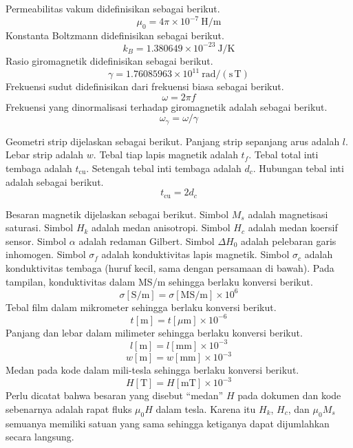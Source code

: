 \documentclass[a4paper,11pt]{article}
\begin{document}
Permeabilitas vakum didefinisikan sebagai berikut.
\begin{equation*}
\mu_{0} = 4\pi\times 10^{-7}\ \mathrm{H/m}
\end{equation*}
Konstanta Boltzmann didefinisikan sebagai berikut.
\begin{equation*}
k_{B} = 1.380649\times 10^{-23}\ \mathrm{J/K}
\end{equation*}
Rasio giromagnetik didefinisikan sebagai berikut.
\begin{equation*}
\gamma = 1.76085963\times 10^{11}\ \mathrm{rad/(s\,T)}
\end{equation*}
Frekuensi sudut didefinisikan dari frekuensi biasa sebagai berikut.
\begin{equation*}
\omega = 2\pi f
\end{equation*}
Frekuensi yang dinormalisasi terhadap giromagnetik adalah sebagai berikut.
\begin{equation*}
\omega_{\gamma} = \omega / \gamma
\end{equation*}

Geometri strip dijelaskan sebagai berikut.
Panjang strip sepanjang arus adalah $l$.
Lebar strip adalah $w$.
Tebal tiap lapis magnetik adalah $t_{f}$.
Tebal total inti tembaga adalah $t_{\mathrm{cu}}$.
Setengah tebal inti tembaga adalah $d_{c}$.
Hubungan tebal inti adalah sebagai berikut.
\begin{equation*}
t_{\mathrm{cu}} = 2d_{c}
\end{equation*}

Besaran magnetik dijelaskan sebagai berikut.
Simbol $M_{s}$ adalah magnetisasi saturasi.
Simbol $H_{k}$ adalah medan anisotropi.
Simbol $H_{c}$ adalah medan koersif sensor.
Simbol $\alpha$ adalah redaman Gilbert.
Simbol $\Delta H_{0}$ adalah pelebaran garis inhomogen.
Simbol $\sigma_{f}$ adalah konduktivitas lapis magnetik.
Simbol $\sigma_{c}$ adalah konduktivitas tembaga (huruf kecil, sama dengan persamaan di bawah).
Pada tampilan, konduktivitas dalam MS/m sehingga berlaku konversi berikut.
\begin{equation*}
\sigma[\mathrm{S/m}] = \sigma[\mathrm{MS/m}]\times 10^{6}
\end{equation*}
Tebal film dalam mikrometer sehingga berlaku konversi berikut.
\begin{equation*}
t[\mathrm{m}] = t[\mu\mathrm{m}]\times 10^{-6}
\end{equation*}
Panjang dan lebar dalam milimeter sehingga berlaku konversi berikut.
\begin{equation*}
l[\mathrm{m}] = l[\mathrm{mm}]\times 10^{-3}
\end{equation*}
\begin{equation*}
w[\mathrm{m}] = w[\mathrm{mm}]\times 10^{-3}
\end{equation*}
Medan pada kode dalam mili-tesla sehingga berlaku konversi berikut.
\begin{equation*}
H[\mathrm{T}] = H[\mathrm{mT}]\times 10^{-3}
\end{equation*}
Perlu dicatat bahwa besaran yang disebut ``medan'' $H$ pada dokumen dan
kode sebenarnya adalah rapat fluks $\mu_{0}H$ dalam tesla. Karena itu
$H_{k}$, $H_{c}$, dan $\mu_{0}M_{s}$ semuanya memiliki satuan yang sama
sehingga ketiganya dapat dijumlahkan secara langsung.
\end{document}

